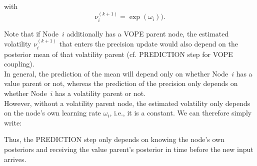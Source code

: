 \noindent
{}%
\vspace{0.5cm}

\noindent
with
\begin{equation*}
\nu_i^{(k+1)} = \exp(\omega_i)).
\end{equation*}

Note that if Node~$i$ additionally has a \textsf{VOPE} parent node, the estimated volatility $\nu_i^{(k+1)}$ that enters the precision update would also depend on the posterior mean of that volatility parent (cf. \textsf{PREDICTION step} for \textsf{VOPE} coupling).\\

In general, the prediction of the mean will depend only on whether Node~$i$ has a value parent or not, whereas the prediction of the precision only depends on whether Node~$i$ has a volatility parent or not. \\

However, without a volatility parent node, the estimated volatility only depends on the node's own learning rate $\omega_i$, i.e., it is a constant. We can therefore simply write:
\vspace{0.5cm}

\noindent
{}%
\vspace{0.5cm}

\noindent

Thus, the \textsf{PREDICTION step} only depends on knowing the node's own posteriors and receiving the value parent's posterior in time before the new input arrives. \\


